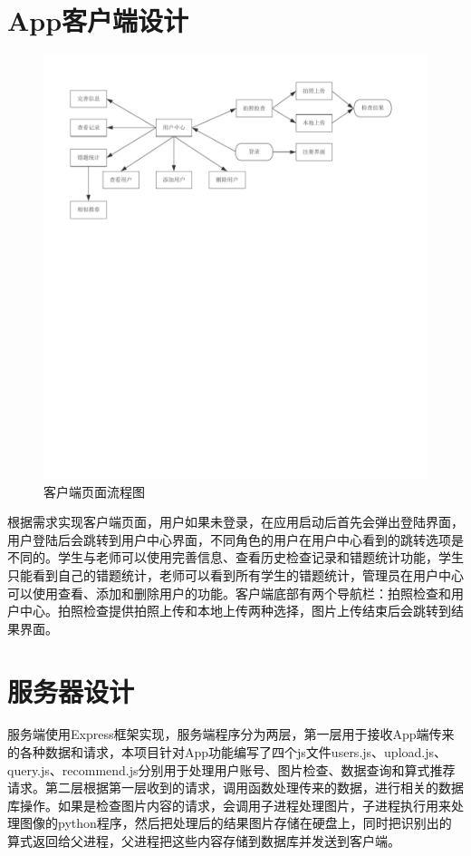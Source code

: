 \section{App客户端设计}
\begin{figure}[h]
	\centering
	\includegraphics[width=350bp]{picture/page.pdf}
	\caption{客户端页面流程图}
	\label{fig:}
\end{figure}

根据需求实现客户端页面，用户如果未登录，在应用启动后首先会弹出登陆界面，用户登陆后会跳转到用户中心界面，不同角色的用户在用户中心看到的跳转选项是不同的。学生与老师可以使用完善信息、查看历史检查记录和错题统计功能，学生只能看到自己的错题统计，老师可以看到所有学生的错题统计，管理员在用户中心可以使用查看、添加和删除用户的功能。客户端底部有两个导航栏：拍照检查和用户中心。拍照检查提供拍照上传和本地上传两种选择，图片上传结束后会跳转到结果界面。

\section{服务器设计}
服务端使用Express框架实现，服务端程序分为两层，第一层用于接收App端传来的各种数据和请求，本项目针对App功能编写了四个js文件users.js、upload.js、query.js、recommend.js分别用于处理用户账号、图片检查、数据查询和算式推荐请求。第二层根据第一层收到的请求，调用函数处理传来的数据，进行相关的数据库操作。如果是检查图片内容的请求，会调用子进程处理图片，子进程执行用来处理图像的python程序，然后把处理后的结果图片存储在硬盘上，同时把识别出的算式返回给父进程，父进程把这些内容存储到数据库并发送到客户端。

